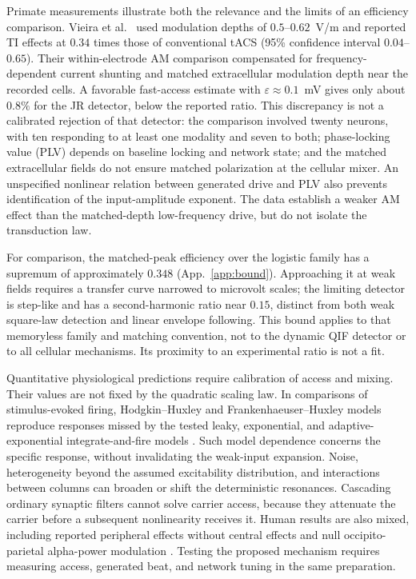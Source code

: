 \documentclass[11pt,a4paper]{article}
\begin{document}
Primate measurements illustrate both the relevance and the limits of an efficiency
comparison. Vieira et al.\ \cite{vieira2024} used modulation depths of
$0.5$--$0.62$~V/m and reported TI effects at $0.34$ times those of conventional
tACS (95\% confidence interval $0.04$--$0.65$). Their within-electrode AM comparison
compensated for frequency-dependent current shunting and matched extracellular
modulation depth near the recorded cells. A favorable fast-access estimate with
$\varepsilon\approx0.1$~mV gives only about $0.8\%$ for the JR detector, below the
reported ratio. This discrepancy is not a calibrated rejection of that detector:
the comparison involved twenty neurons, with ten responding to at least one
modality and seven to both; phase-locking value (PLV) depends on baseline locking
and network state; and the matched extracellular fields do not ensure matched
polarization at the cellular mixer. An unspecified nonlinear relation between
generated drive and PLV also prevents identification of the input-amplitude
exponent. The data establish a weaker AM effect than the matched-depth
low-frequency drive, but do not isolate the transduction law.

For comparison, the matched-peak efficiency over the logistic family has a supremum
of approximately $0.348$ (App.~\ref{app:bound}). Approaching it at weak fields
requires a transfer curve narrowed to microvolt scales; the limiting detector is
step-like and has a second-harmonic ratio near $0.15$, distinct from both weak
square-law detection and linear envelope following. This bound applies to that
memoryless family and matching convention, not to the dynamic QIF detector or to
all cellular mechanisms. Its proximity to an experimental ratio is not a fit.

Quantitative physiological predictions require calibration of access and mixing.
Their values are not fixed by the quadratic scaling law. In comparisons of
stimulus-evoked firing, Hodgkin--Huxley and Frankenhaeuser--Huxley models reproduce
responses missed by the tested leaky, exponential, and adaptive-exponential
integrate-and-fire models \cite{plovie2025}. Such model dependence concerns the
specific response, without invalidating the weak-input expansion. Noise,
heterogeneity beyond the assumed excitability distribution, and interactions
between columns can broaden or shift the deterministic resonances. Cascading
ordinary synaptic filters cannot solve carrier access, because they attenuate
the carrier before a subsequent nonlinearity receives it. Human results are also
mixed, including reported peripheral effects without central effects
\cite{iszak2023} and null occipito-parietal alpha-power modulation
\cite{mansourinezhad2025}. Testing the proposed mechanism requires measuring
access, generated beat, and network tuning in the same preparation.
\end{document}
